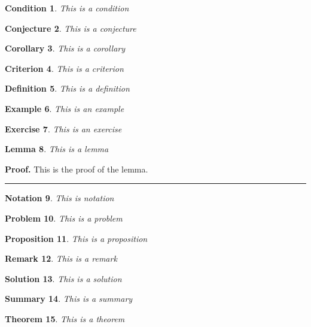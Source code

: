 \documentclass[aps,preprint]{revtex4}%
\newtheorem{theorem}{Theorem}
\newtheorem{condition}[theorem]{Condition}
\newtheorem{conjecture}[theorem]{Conjecture}
\newtheorem{corollary}[theorem]{Corollary}
\newtheorem{criterion}[theorem]{Criterion}
\newtheorem{definition}[theorem]{Definition}
\newtheorem{example}[theorem]{Example}
\newtheorem{exercise}[theorem]{Exercise}
\newtheorem{lemma}[theorem]{Lemma}
\newtheorem{notation}[theorem]{Notation}
\newtheorem{problem}[theorem]{Problem}
\newtheorem{proposition}[theorem]{Proposition}
\newtheorem{remark}[theorem]{Remark}
\newtheorem{solution}[theorem]{Solution}
\newtheorem{summary}[theorem]{Summary}
\newenvironment{proof}[1][Proof]{\noindent\textbf{#1.} }{\ \rule{0.5em}{0.5em}}
\begin{document}
\begin{condition}
This is a condition
\end{condition}

\begin{conjecture}
This is a conjecture
\end{conjecture}

\begin{corollary}
This is a corollary
\end{corollary}

\begin{criterion}
This is a criterion
\end{criterion}

\begin{definition}
This is a definition
\end{definition}

\begin{example}
This is an example
\end{example}

\begin{exercise}
This is an exercise
\end{exercise}

\begin{lemma}
This is a lemma
\end{lemma}

\begin{proof}
This is the proof of the lemma.
\end{proof}

\begin{notation}
This is notation
\end{notation}

\begin{problem}
This is a problem
\end{problem}

\begin{proposition}
This is a proposition
\end{proposition}

\begin{remark}
This is a remark
\end{remark}

\begin{solution}
This is a solution
\end{solution}

\begin{summary}
This is a summary
\end{summary}

\begin{theorem}
This is a theorem
\end{theorem}
\end{document}
